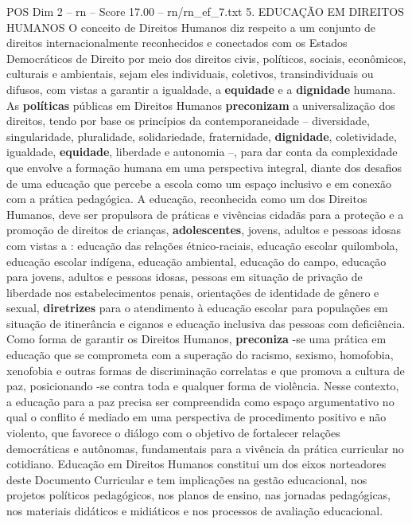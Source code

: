 \begin{textsample}{POS Dim 2 – rn – Score 17.00 – rn/rn\_ef\_7.txt}  \label{ex:f2_pos_250}
5.
EDUCAÇÃO EM DIREITOS HUMANOS O conceito de Direitos Humanos diz respeito a um conjunto de direitos internacionalmente reconhecidos e conectados com os Estados Democráticos de Direito por meio dos direitos civis, políticos, sociais, econômicos, culturais e ambientais, sejam eles individuais, coletivos, transindividuais ou difusos, com vistas a garantir a igualdade, a \textbf{equidade} e a \textbf{dignidade} humana.
As \textbf{políticas} públicas em Direitos Humanos \textbf{preconizam} a universalização dos direitos, tendo por base os princípios da contemporaneidade – diversidade, singularidade, pluralidade, solidariedade, fraternidade, \textbf{dignidade}, coletividade, igualdade, \textbf{equidade}, liberdade e autonomia –, para dar conta da complexidade que envolve a formação humana em uma perspectiva integral, diante dos desafios de uma educação que percebe a escola como um espaço inclusivo e em conexão com a prática pedagógica.
A educação, reconhecida como um dos Direitos Humanos, deve ser propulsora de práticas e vivências cidadãs para a proteção e a promoção de direitos de crianças, \textbf{adolescentes}, jovens, adultos e pessoas idosas com vistas a : educação das relações étnico-raciais, educação escolar quilombola, educação escolar indígena, educação ambiental, educação do campo, educação para jovens, adultos e pessoas idosas, pessoas em situação de privação de liberdade nos estabelecimentos penais, orientações de identidade de gênero e sexual, \textbf{diretrizes} para o atendimento à educação escolar para populações em situação de itinerância e ciganos e educação inclusiva das pessoas com deficiência.
Como forma de garantir os Direitos Humanos, \textbf{preconiza} -se uma prática em educação que se comprometa com a superação do racismo, sexismo, homofobia, xenofobia e outras formas de discriminação correlatas e que promova a cultura de paz, posicionando -se contra toda e qualquer forma de violência.
Nesse contexto, a educação para a paz precisa ser compreendida como espaço argumentativo no qual o conflito é mediado em uma perspectiva de procedimento positivo e não violento, que favorece o diálogo com o objetivo de fortalecer relações democráticas e autônomas, fundamentais para a vivência da prática curricular no cotidiano.
Educação em Direitos Humanos constitui um dos eixos norteadores deste Documento Curricular e tem implicações na gestão educacional, nos projetos políticos pedagógicos, nos planos de ensino, nas jornadas pedagógicas, nos materiais didáticos e midiáticos e nos processos de avaliação educacional.

\end{textsample}
